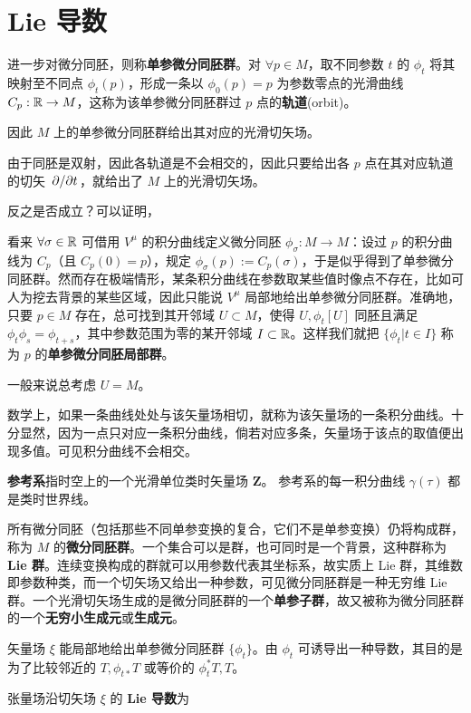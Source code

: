 \section{Lie 导数}\label{appx:Lie-deri}

进一步对微分同胚，则称\textbf{单参微分同胚群}。对 $\forall p\in M$，取不同参数 $t$ 的 $\phi_t$ 将其映射至不同点 $\phi_t(p)$，形成一条以 $\phi_0(p)=p$ 为参数零点的光滑曲线 $C_p:\mathbb{R}\to M$，这称为该单参微分同胚群过 $p$ 点的\textbf{轨道}(orbit)。

因此 $M$ 上的单参微分同胚群给出其对应的光滑切矢场。

由于同胚是双射，因此各轨道是不会相交的，因此只要给出各 $p$ 点在其对应轨道的切矢 $\pdv*{t}$，就给出了 $M$ 上的光滑切矢场。

反之是否成立？可以证明，


看来 $\forall \sigma\in\mathbb{R}$ 可借用 $V^\mu$ 的积分曲线定义微分同胚 $\phi_\sigma:M\to M$：设过 $p$ 的积分曲线为 $C_p$（且 $C_p(0)=p$），规定 $\phi_\sigma(p):=C_p(\sigma)$，于是似乎得到了单参微分同胚群。然而存在极端情形，某条积分曲线在参数取某些值时像点不存在，比如可人为挖去背景的某些区域，因此只能说 $V^\mu$ 局部地给出单参微分同胚群。准确地，只要 $p\in M$ 存在，总可找到其开邻域 $U\subset M$，使得 $U,\phi_t[U]$ 同胚且满足$\phi_t\phi_s=\phi_{t+s}$，其中参数范围为零的某开邻域 $I\subset\mathbb{R}$。这样我们就把 $\{\phi_t|t\in I\}$ 称为 $p$ 的\textbf{单参微分同胚局部群}。

一般来说总考虑 $U=M$。

数学上，如果一条曲线处处与该矢量场相切，就称为该矢量场的一条积分曲线。十分显然，因为一点只对应一条积分曲线，倘若对应多条，矢量场于该点的取值便出现多值。可见积分曲线不会相交。

\textbf{参考系}指时空上的一个光滑单位类时矢量场 $\bm Z$。
参考系的每一积分曲线 $\gamma(\tau)$ 都是类时世界线。

所有微分同胚（包括那些不同单参变换的复合，它们不是单参变换）仍将构成群，称为 $M$ 的\textbf{微分同胚群}。一个集合可以是群，也可同时是一个背景，这种群称为 \textbf{Lie 群}。连续变换构成的群就可以用参数代表其坐标系，故实质上 Lie 群，其维数即参数种类，而一个切矢场又给出一种参数，可见微分同胚群是一种无穷维 Lie 群。一个光滑切矢场生成的是微分同胚群的一个\textbf{单参子群}，故又被称为微分同胚群的一个\textbf{无穷小生成元}或\textbf{生成元}。

矢量场 $\xi$ 能局部地给出单参微分同胚群 $\{\phi_t\}$。由 $\phi_t$ 可诱导出一种导数，其目的是为了比较邻近的 $T,\phi_{t*} T$ 或等价的 $\phi_t^*T,T$。
\begin{definition}
    张量场沿切矢场 $\xi$ 的 \textbf{Lie 导数}为
\end{definition}

